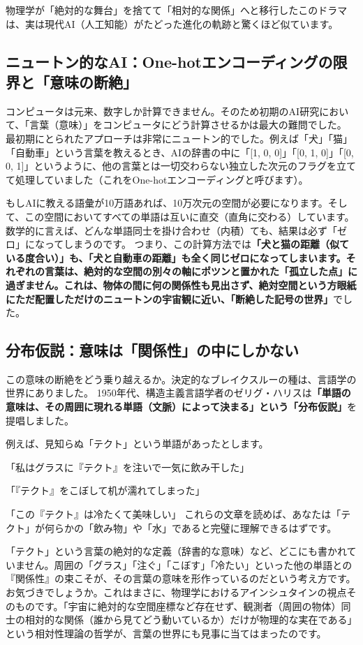 物理学が「絶対的な舞台」を捨てて「相対的な関係」へと移行したこのドラマは、実は現代AI（人工知能）がたどった進化の軌跡と驚くほど似ています。

\subsection{ニュートン的なAI：One-hotエンコーディングの限界と「意味の断絶」}

コンピュータは元来、数字しか計算できません。そのため初期のAI研究において、「言葉（意味）」をコンピュータにどう計算させるかは最大の難問でした。 最初期にとられたアプローチは非常にニュートン的でした。例えば「犬」「猫」「自動車」という言葉を教えるとき、AIの辞書の中に「[1, 0, 0]」「[0, 1, 0]」「[0, 0, 1]」というように、他の言葉とは一切交わらない独立した次元のフラグを立てて処理していました（これをOne-hotエンコーディングと呼びます）。

もしAIに教える語彙が10万語あれば、10万次元の空間が必要になります。そして、この空間においてすべての単語は互いに直交（直角に交わる）しています。数学的に言えば、どんな単語同士を掛け合わせ（内積）ても、結果は必ず「ゼロ」になってしまうのです。 つまり、この計算方法では\textbf{「犬と猫の距離（似ている度合い）」も、「犬と自動車の距離」も全く同じゼロになってしまいます。それぞれの言葉は、絶対的な空間の別々の軸にポツンと置かれた「孤立した点」に過ぎません。これは、物体の間に何の関係性も見出さず、絶対空間という方眼紙にただ配置しただけのニュートンの宇宙観に近い、「断絶した記号の世界」}でした。

\subsection{分布仮説：意味は「関係性」の中にしかない}

この意味の断絶をどう乗り越えるか。決定的なブレイクスルーの種は、言語学の世界にありました。 1950年代、構造主義言語学者のゼリグ・ハリスは\textbf{「単語の意味は、その周囲に現れる単語（文脈）によって決まる」という「分布仮説」}を提唱しました。

例えば、見知らぬ「テクト」という単語があったとします。

「私はグラスに『テクト』を注いで一気に飲み干した」

「『テクト』をこぼして机が濡れてしまった」

「この『テクト』は冷たくて美味しい」 これらの文章を読めば、あなたは「テクト」が何らかの「飲み物」や「水」であると完璧に理解できるはずです。

「テクト」という言葉の絶対的な定義（辞書的な意味）など、どこにも書かれていません。周囲の「グラス」「注ぐ」「こぼす」「冷たい」といった他の単語との『関係性』の束こそが、その言葉の意味を形作っているのだという考え方です。 お気づきでしょうか。これはまさに、物理学におけるアインシュタインの視点そのものです。「宇宙に絶対的な空間座標など存在せず、観測者（周囲の物体）同士の相対的な関係（誰から見てどう動いているか）だけが物理的な実在である」という相対性理論の哲学が、言葉の世界にも見事に当てはまったのです。


